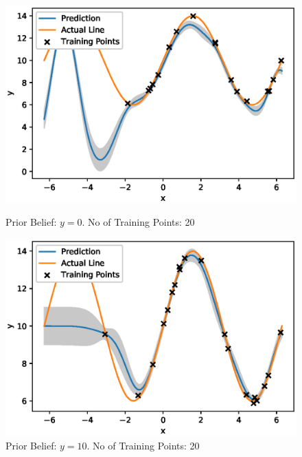 \begin{figure}[H]
\centering
\begin{minipage}{.5\textwidth}
  \centering
        \includegraphics[width=\textwidth]{images/GP_Explanation/zero_const_mean_20_training.eps}
        
        \caption{Prior Belief: $y=0$. No of Training Points: 20}
        \label{fig:gp_plot_y0_20}
\end{minipage}%
\begin{minipage}{.5\textwidth}
  \centering
        \includegraphics[width=\textwidth]{images/GP_Explanation/10_const_mean_20_training.eps}
        \caption{Prior Belief: $y=10$. No of Training Points: 20}
        \label{fig:gp_plot_y10_20}
\end{minipage}
\end{figure}





